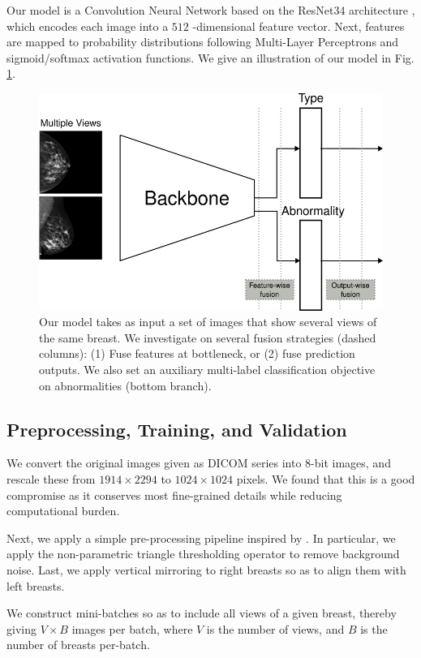 \documentclass[11pt]{article}
\begin{document}
Our model is a Convolution Neural Network based on the ResNet34
architecture \autocite{he15}, which encodes each image into a \(512\) -dimensional feature
vector.
Next, features are mapped to probability distributions following Multi-Layer Perceptrons
and sigmoid/softmax activation functions.
We give an illustration of our model in Fig. \ref{fig:model}.

\begin{figure}[htbp]
\centering
\includegraphics[width=.9\linewidth]{./images/model.png}
\caption{\label{fig:model}Our model takes as input a set of images that show several views of the same breast. We investigate on several fusion strategies (dashed columns): (1) Fuse features at bottleneck, or (2) fuse prediction outputs. We also set an auxiliary multi-label classification objective on abnormalities (bottom branch).}
\end{figure}

\subsection{Preprocessing, Training, and Validation}
\label{sec:orgb83bb30}

We convert the original images given as DICOM series into 8-bit images,
and rescale these from \(1914 \times 2294\) to \(1024 \times 1024\) pixels. We found that this
is a good compromise as it conserves most fine-grained details while
reducing computational burden.

Next, we apply a simple pre-processing pipeline inspired by \autocite{walsh22}.
In particular, we apply the non-parametric triangle thresholding operator \autocite{zack77}
to remove background noise.
Last, we apply vertical mirroring to right breasts so as to align them with left breasts.

We construct mini-batches so as to include all views of a given breast, thereby
giving \(V \times B\) images per batch, where \(V\) is the number of views,
and \(B\) is the number of breasts per-batch.
\end{document}
